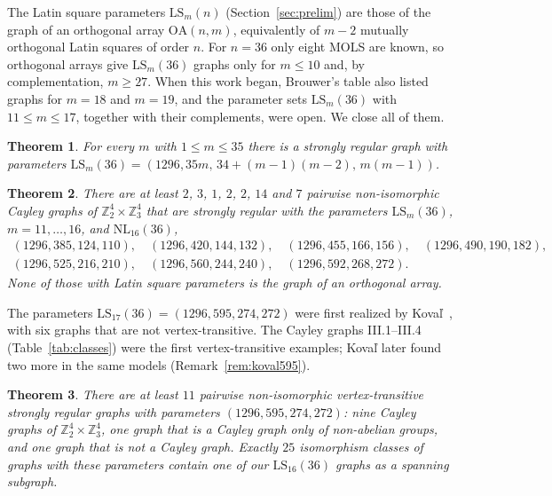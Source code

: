 \documentclass[11pt]{amsart}
\newtheorem{theorem}{Theorem}[section]
\theoremstyle{definition}
\newcommand{\Z}{\mathbb{Z}}
\newcommand{\LS}{\mathrm{LS}}
\newcommand{\NL}{\mathrm{NL}}
\begin{document}
The Latin square parameters $\LS_m(n)$ (Section~\ref{sec:prelim}) are those of the graph of an orthogonal array $\mathrm{OA}(n,m)$, equivalently of $m-2$ mutually orthogonal Latin squares of order $n$. For $n=36$ only eight MOLS are known, so orthogonal arrays give $\LS_m(36)$ graphs only for $m\le10$ and, by complementation, $m\ge27$. When this work began, Brouwer's table also listed graphs for $m=18$ and $m=19$, and the parameter sets $\LS_m(36)$ with $11\le m\le17$, together with their complements, were open. We close all of them.

\begin{theorem}\label{thm:complete}
For every $m$ with $1\le m\le35$ there is a strongly regular graph with parameters $\LS_m(36)=(1296,35m,\,34+(m-1)(m-2),\,m(m-1))$.
\end{theorem}

\begin{theorem}\label{thm:main}
There are at least $2$, $3$, $1$, $2$, $2$, $14$ and $7$ pairwise non-isomorphic Cayley graphs of $\Z_2^4\times\Z_3^4$ that are strongly regular with the parameters $\LS_m(36)$, $m=11,\dots,16$, and $\NL_{16}(36)$,
\[
\begin{gathered}
(1296,385,124,110),\quad (1296,420,144,132),\quad (1296,455,166,156),\quad (1296,490,190,182),\\
(1296,525,216,210),\quad (1296,560,244,240),\quad (1296,592,268,272).
\end{gathered}
\]
None of those with Latin square parameters is the graph of an orthogonal array.
\end{theorem}

The parameters $\LS_{17}(36)=(1296,595,274,272)$ were first realized by Kova\v{l}~\cite{KovalMultiOrbit}, with six graphs that are not vertex-transitive. The Cayley graphs III.1--III.4 (Table~\ref{tab:classes}) were the first vertex-transitive examples; Kova\v{l} later found two more in the same models (Remark~\ref{rem:koval595}).

\begin{theorem}\label{thm:595}
There are at least $11$ pairwise non-isomorphic vertex-transitive strongly regular graphs with parameters $(1296,595,274,272)$: nine Cayley graphs of $\Z_2^4\times\Z_3^4$, one graph that is a Cayley graph only of non-abelian groups, and one graph that is not a Cayley graph. Exactly $25$ isomorphism classes of graphs with these parameters contain one of our $\LS_{16}(36)$ graphs as a spanning subgraph.
\end{theorem}
\end{document}
